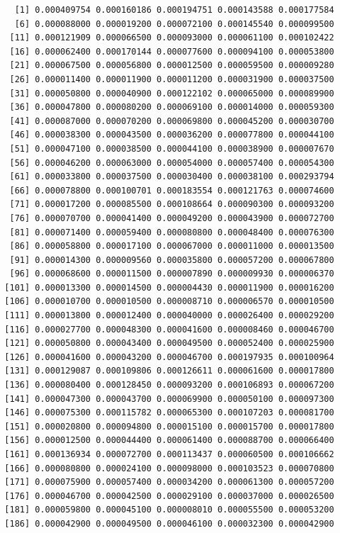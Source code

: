 \documentclass[]{article}
\begin{document}
\begin{verbatim}
    [1] 0.000409754 0.000160186 0.000194751 0.000143588 0.000177584
    [6] 0.000088000 0.000019200 0.000072100 0.000145540 0.000099500
   [11] 0.000121909 0.000066500 0.000093000 0.000061100 0.000102422
   [16] 0.000062400 0.000170144 0.000077600 0.000094100 0.000053800
   [21] 0.000067500 0.000056800 0.000012500 0.000059500 0.000009280
   [26] 0.000011400 0.000011900 0.000011200 0.000031900 0.000037500
   [31] 0.000050800 0.000040900 0.000122102 0.000065000 0.000089900
   [36] 0.000047800 0.000080200 0.000069100 0.000014000 0.000059300
   [41] 0.000087000 0.000070200 0.000069800 0.000045200 0.000030700
   [46] 0.000038300 0.000043500 0.000036200 0.000077800 0.000044100
   [51] 0.000047100 0.000038500 0.000044100 0.000038900 0.000007670
   [56] 0.000046200 0.000063000 0.000054000 0.000057400 0.000054300
   [61] 0.000033800 0.000037500 0.000030400 0.000038100 0.000293794
   [66] 0.000078800 0.000100701 0.000183554 0.000121763 0.000074600
   [71] 0.000017200 0.000085500 0.000108664 0.000090300 0.000093200
   [76] 0.000070700 0.000041400 0.000049200 0.000043900 0.000072700
   [81] 0.000071400 0.000059400 0.000080800 0.000048400 0.000076300
   [86] 0.000058800 0.000017100 0.000067000 0.000011000 0.000013500
   [91] 0.000014300 0.000009560 0.000035800 0.000057200 0.000067800
   [96] 0.000068600 0.000011500 0.000007890 0.000009930 0.000006370
  [101] 0.000013300 0.000014500 0.000004430 0.000011900 0.000016200
  [106] 0.000010700 0.000010500 0.000008710 0.000006570 0.000010500
  [111] 0.000013800 0.000012400 0.000040000 0.000026400 0.000029200
  [116] 0.000027700 0.000048300 0.000041600 0.000008460 0.000046700
  [121] 0.000050800 0.000043400 0.000049500 0.000052400 0.000025900
  [126] 0.000041600 0.000043200 0.000046700 0.000197935 0.000100964
  [131] 0.000129087 0.000109806 0.000126611 0.000061600 0.000017800
  [136] 0.000080400 0.000128450 0.000093200 0.000106893 0.000067200
  [141] 0.000047300 0.000043700 0.000069900 0.000050100 0.000097300
  [146] 0.000075300 0.000115782 0.000065300 0.000107203 0.000081700
  [151] 0.000020800 0.000094800 0.000015100 0.000015700 0.000017800
  [156] 0.000012500 0.000044400 0.000061400 0.000088700 0.000066400
  [161] 0.000136934 0.000072700 0.000113437 0.000060500 0.000106662
  [166] 0.000080800 0.000024100 0.000098000 0.000103523 0.000070800
  [171] 0.000075900 0.000057400 0.000034200 0.000061300 0.000057200
  [176] 0.000046700 0.000042500 0.000029100 0.000037000 0.000026500
  [181] 0.000059800 0.000045100 0.000008010 0.000055500 0.000053200
  [186] 0.000042900 0.000049500 0.000046100 0.000032300 0.000042900

\end{verbatim}
\end{document}
